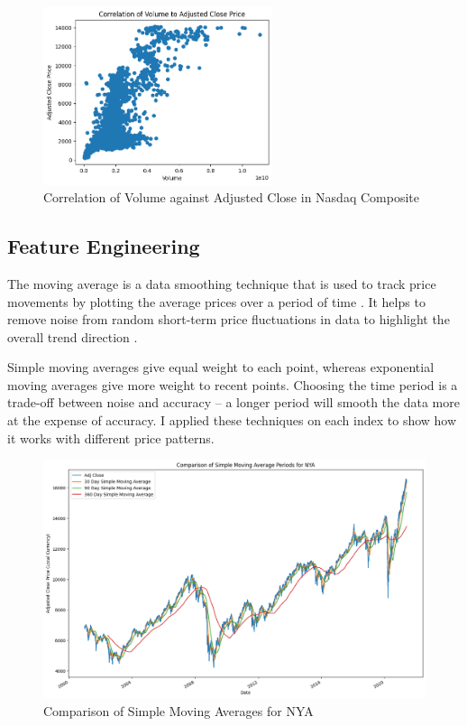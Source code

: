 \documentclass[a4paper, 11pt]{article}
\begin{document}
\begin{figure}[H]
    \begin{center}
        \includegraphics[width=0.6\textwidth]{Correlation of Volume to Adjusted Close Price.png}
        \caption{Correlation of Volume against Adjusted Close in Nasdaq Composite}
    \end{center}
\end{figure}


\subsection{Feature Engineering}
The moving average is a data smoothing technique that is used to track price movements by plotting the average prices over a period of time \cite{movingAverageChart}. It helps to remove noise from random short-term price fluctuations in data to highlight the overall trend direction \cite{movingAverageChart}.

Simple moving averages give equal weight to each point, whereas exponential moving averages give more weight to recent points. Choosing the time period is a trade-off between noise and accuracy -- a longer period will smooth the data more at the expense of accuracy. I applied these techniques on each index to show how it works with different price patterns.

\begin{figure}[H]
    \begin{center}
        \includegraphics[width=1\textwidth]{Simple Moving Averages for NYA.png}
        \caption{Comparison of Simple  Moving Averages for NYA}
    \end{center}
\end{figure}
\end{document}
